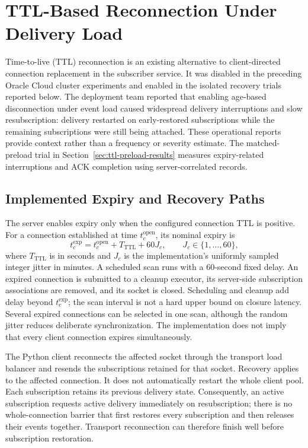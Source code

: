 \section{TTL-Based Reconnection Under Delivery Load}
\label{sec:ttl-reconnection}

Time-to-live (TTL) reconnection is an existing alternative to client-directed
connection replacement in the subscriber service. It was disabled in the
preceding Oracle Cloud cluster experiments and enabled in the isolated
recovery trials reported below. The deployment
team reported that enabling age-based disconnection under event load caused
widespread delivery interruptions and slow resubscription: delivery restarted
on early-restored subscriptions while the remaining subscriptions were still
being attached. These operational reports provide context rather than a
frequency or severity estimate. The matched-preload trial in
Section~\ref{sec:ttl-preload-results} measures
expiry-related interruptions and ACK completion using server-correlated records.

\subsection{Implemented Expiry and Recovery Paths}

The server enables expiry only when the configured connection TTL is positive.
For a connection established at time $t_c^{\mathrm{open}}$, its nominal expiry is
\[
 t_c^{\mathrm{exp}}=t_c^{\mathrm{open}}+T_{\mathrm{TTL}}+60J_c,
 \qquad J_c\in\{1,\ldots,60\},
\]
where $T_{\mathrm{TTL}}$ is in seconds and $J_c$ is the implementation's
uniformly sampled integer jitter in minutes. A scheduled scan runs with a
60-second fixed delay. An expired connection is submitted to a cleanup
executor, its server-side subscription associations are removed, and its
socket is closed. Scheduling and cleanup add delay beyond $t_c^{\mathrm{exp}}$; the scan
interval is not a hard upper bound on closure latency. Several expired
connections can be selected in one scan, although the random jitter reduces
deliberate synchronization. The implementation does not imply that every
client connection expires simultaneously.

The Python client reconnects the affected socket through the transport load
balancer and resends the subscriptions retained for that socket. Recovery applies to the affected connection. It does not automatically
restart the whole client pool. Each
subscription retains its previous delivery state. Consequently, an active
subscription requests active delivery immediately on resubscription; there is
no whole-connection barrier that first restores every subscription and then
releases their events together. Transport reconnection can therefore finish
well before subscription restoration.

